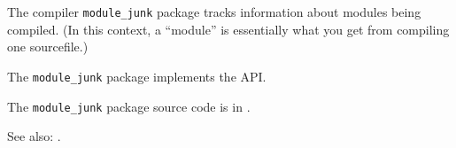 
The compiler {\tt module\_junk} package tracks information about modules being 
compiled.  (In this context, a ``module'' is essentially what you get from 
compiling one sourcefile.)

The {\tt module\_junk} package implements the  API.

The {\tt module\_junk} package source code is in .

See also: .




